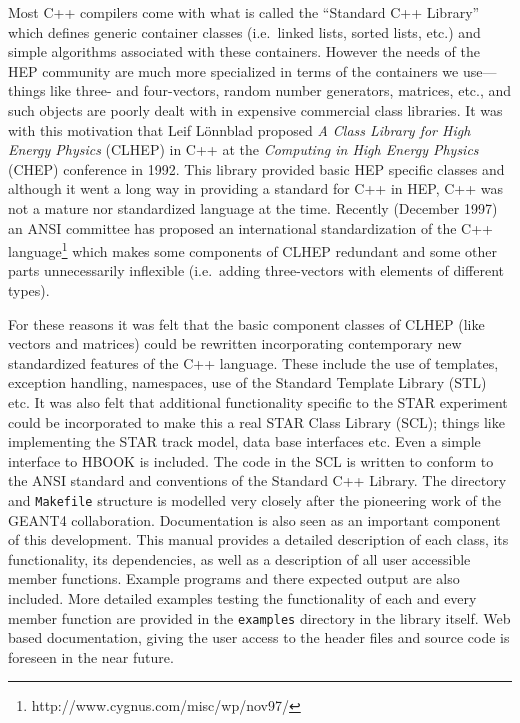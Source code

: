 \documentclass[twoside]{article}
\newcommand{\comp}[1]{\texttt{#1}}%
\begin{document}
Most C++ compilers come with what is called the ``Standard C++
Library'' which defines generic container
classes (i.e.~linked lists, sorted lists, etc.) and simple algorithms
associated with these containers.  However the needs of the HEP community
are much more specialized in terms of the containers we use---things
like three- and four-vectors, random number generators, matrices, etc.,
and such objects are poorly dealt with in expensive commercial class
libraries.  It was with this motivation that  Leif L\"{o}nnblad proposed
{\em A Class Library for High Energy Physics} (CLHEP)  in C++ at the
{\em Computing in High Energy Physics} (CHEP) conference in 1992.  This library provided
basic HEP specific classes and although it went a long way in providing a
standard for C++ in HEP, C++ was not a mature nor standardized language
at the time.  Recently (December 1997) an ANSI committee has proposed
an international standardization of the C++
language\footnote{http://www.cygnus.com/misc/wp/nov97/}
which makes some components of CLHEP redundant and some other parts
unnecessarily inflexible (i.e.~adding three-vectors with elements of
different types).

For these reasons it was felt that the basic component classes of CLHEP
(like vectors and matrices) could be rewritten incorporating contemporary
new standardized features of the C++
language.  These include the use of templates, exception handling, 
namespaces, use of the Standard Template Library (STL)
 etc.  It was also felt that additional functionality specific
to the STAR experiment could be incorporated to make this a real
STAR Class Library (SCL); things like implementing the STAR track model,
data base interfaces etc.  Even a simple interface to HBOOK is included.
The code in the SCL is written to conform to the ANSI standard
and conventions of the Standard C++ Library.  The directory 
and \texttt{Makefile} structure is modelled very closely after the
pioneering work of the GEANT4 collaboration.  Documentation is also seen as
an important component of this development.  This manual provides a detailed
description of each class, its functionality, its dependencies, as well as
a description of all user accessible member functions.  Example programs
and there expected output are also included.  More detailed examples
testing the functionality of each and every member function are provided in
the \comp{examples} directory in the library itself.  Web based documentation,
giving the user access to the header files and source code is foreseen
in the near future.
\end{document}
